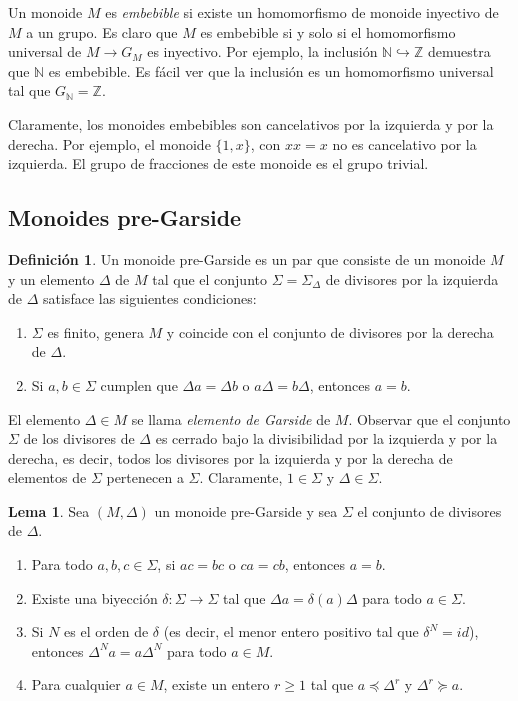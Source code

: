 \documentclass[12pt]{book}
\theoremstyle{definition}
\newtheorem{defi}{Definición}[section]
\newtheorem{lema}{Lema}[section]
\begin{document}
Un monoide $M$ es \textit{embebible} si existe un homomorfismo de monoide inyectivo de $M$ a un grupo. Es claro que $M$ es embebible si y solo si el homomorfismo universal de $M\rightarrow G_M$ es inyectivo. Por ejemplo, la inclusión $\mathbb{N}\hookrightarrow\mathbb{Z}$ demuestra que $\mathbb{N}$ es embebible. Es fácil ver que la inclusión es un homomorfismo universal tal que $G_\mathbb{N}=\mathbb{Z}$.

Claramente, los monoides embebibles son cancelativos por la izquierda y por la derecha. Por ejemplo, el monoide $\{1,x\}$, con $xx=x$ no es cancelativo por la izquierda. El grupo de fracciones de este monoide es el grupo trivial.

\subsection{Monoides pre-Garside}

\begin{defi}
Un monoide pre-Garside es un par que consiste de un monoide $M$ y un elemento $\Delta$ de $M$ tal que el conjunto $\Sigma=\Sigma_\Delta$ de divisores por la izquierda de $\Delta$ satisface las siguientes condiciones:

\begin{enumerate}
\item $\Sigma$ es finito, genera $M$ y  coincide con el conjunto de divisores por la derecha de $\Delta$.
\item Si $a,b\in\Sigma$ cumplen que $\Delta a=\Delta b$ o $a\Delta=b\Delta$, entonces $a=b$.
\end{enumerate}
\label{defi:pre-garside}
\end{defi}

El elemento $\Delta\in M$ se llama \textit{elemento de Garside} de $M$. Observar que el conjunto $\Sigma$ de los divisores de $\Delta$ es cerrado bajo la divisibilidad por la izquierda y por la derecha, es decir, todos los divisores por la izquierda y por la derecha de elementos de $\Sigma$ pertenecen a $\Sigma$. Claramente, $1\in\Sigma$ y $\Delta\in\Sigma$.

\begin{lema}
Sea $(M,\Delta)$ un monoide pre-Garside y sea $\Sigma$ el conjunto de divisores de $\Delta$.

\begin{enumerate}[label=(\roman*).]
\item Para todo $a,b,c\in\Sigma$, si $ac=bc$ o $ca=cb$, entonces $a=b$.
\item Existe una biyección $\delta:\Sigma\rightarrow \Sigma$ tal que $\Delta a=\delta(a)\Delta$ para todo $a\in\Sigma$.
\item Si $N$ es el orden de $\delta$ (es decir, el menor entero positivo tal que $\delta^{N}=id$), entonces $\Delta^N a=a\Delta^N$ para todo $a\in M$.
\item Para cualquier $a\in M$, existe un entero $r\geq 1$ tal que $a\preceq\Delta^r$ y $\Delta^r\succeq a$.
\end{enumerate}
\label{lema:pre-garside}
\end{lema}
\end{document}
